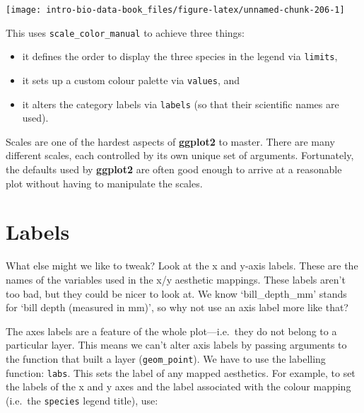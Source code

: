 \documentclass[
]{book}
\providecommand{\tightlist}{%
  \setlength{\itemsep}{0pt}\setlength{\parskip}{0pt}}
\begin{document}
\begin{center}\texttt{[image: intro-bio-data-book\_files/figure-latex/unnamed-chunk-206-1]} \end{center}

This uses \texttt{scale\_color\_manual} to achieve three things:

\begin{itemize}
\tightlist
\item
  it defines the order to display the three species in the legend via \texttt{limits},
\item
  it sets up a custom colour palette via \texttt{values}, and
\item
  it alters the category labels via \texttt{labels} (so that their scientific names are used).
\end{itemize}

Scales are one of the hardest aspects of \textbf{ggplot2} to master. There are many different scales, each controlled by its own unique set of arguments. Fortunately, the defaults used by \textbf{ggplot2} are often good enough to arrive at a reasonable plot without having to manipulate the scales.

\hypertarget{labels}{%
\section{Labels}\label{labels}}

What else might we like to tweak? Look at the x and y-axis labels. These are the names of the variables used in the x/y aesthetic mappings. These labels aren't too bad, but they could be nicer to look at. We know `bill\_depth\_mm' stands for `bill depth (measured in mm)', so why not use an axis label more like that?

The axes labels are a feature of the whole plot---i.e.~they do not belong to a particular layer. This means we can't alter axis labels by passing arguments to the function that built a layer (\texttt{geom\_point}). We have to use the labelling function: \texttt{labs}. This sets the label of any mapped aesthetics. For example, to set the labels of the x and y axes and the label associated with the colour mapping (i.e.~the \texttt{species} legend title), use:
\end{document}
